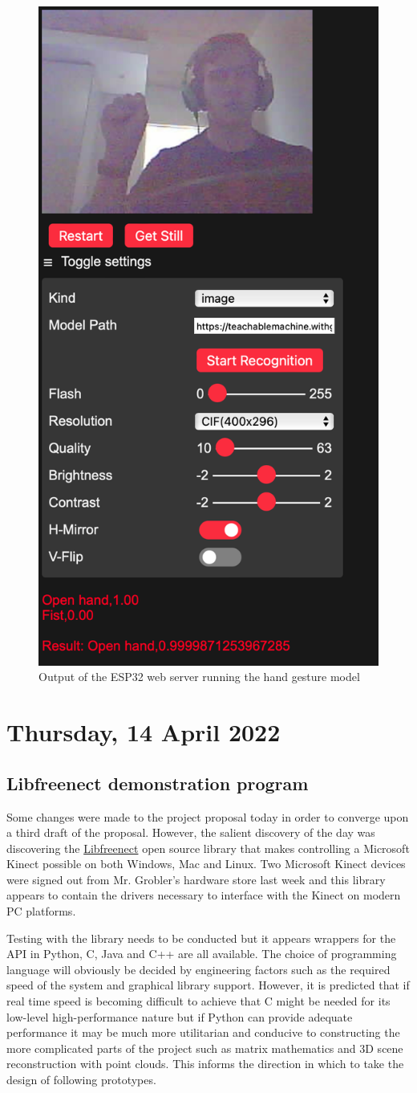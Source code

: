 \begin{figure}[h]
    \centering
    \includegraphics[width=0.3\linewidth]{figures/esp32_cam_fist.png}
    \caption{Output of the ESP32 web server running the hand gesture model}
    \label{fig:esp32_cam2}
\end{figure}

\section[2022/04/14]{Thursday, 14 April 2022}

\subsection{Libfreenect demonstration program}

Some changes were made to the project proposal today in order to converge upon a third draft of the proposal. However, the salient discovery of the day was discovering the \href{https://github.com/OpenKinect/libfreenect}{Libfreenect} open source library that makes controlling a Microsoft Kinect possible on both Windows, Mac and Linux. Two Microsoft Kinect devices were signed out from Mr. Grobler's hardware store last week and this library appears to contain the drivers necessary to interface with the Kinect on modern PC platforms. \newline

Testing with the library needs to be conducted but it appears wrappers for the API in Python, C, Java and C++ are all available. The choice of programming language will obviously be decided by engineering factors such as the required speed of the system and graphical library support. However, it is predicted that if real time speed is becoming difficult to achieve that C might be needed for its low-level high-performance nature but if Python can provide adequate performance it may be much more utilitarian and conducive to constructing the more complicated parts of the project such as matrix mathematics and 3D scene reconstruction with point clouds. This informs the direction in which to take the design of following prototypes.\newline 

